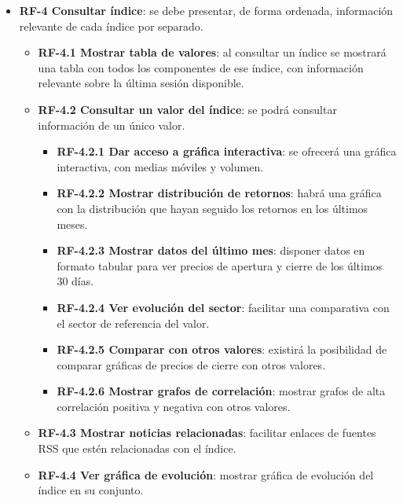 \begin{itemize}
\item
\textbf{RF-4 Consultar índice}: se debe presentar, de forma ordenada, información relevante de cada índice por separado.  
	\begin{itemize}
        \item \textbf{RF-4.1 Mostrar tabla de valores}: al consultar un índice se mostrará 
        una tabla con todos los componentes de ese índice, con información relevante sobre 
        la última sesión disponible. 
        \item \textbf{RF-4.2 Consultar un valor del índice}: se podrá consultar información 
        de un único valor. 
        \begin{itemize}
            \item \textbf{RF-4.2.1 Dar acceso a gráfica interactiva}: se ofrecerá una 
            gráfica interactiva, con medias móviles y volumen. 
            \item \textbf{RF-4.2.2 Mostrar distribución de retornos}: habrá una gráfica con 
            la distribución que hayan seguido los retornos en los últimos meses. 
            \item \textbf{RF-4.2.3 Mostrar datos del último mes}: disponer datos en formato 
            tabular para ver precios de apertura y cierre de los últimos 30 días. 
            \item \textbf{RF-4.2.4 Ver evolución del sector}: facilitar una comparativa con 
            el sector de referencia del valor. 
            \item \textbf{RF-4.2.5 Comparar con otros valores}: existirá la posibilidad de 
            comparar gráficas de precios de cierre con otros valores. 
            \item \textbf{RF-4.2.6 Mostrar grafos de correlación}: mostrar grafos de alta 
            correlación positiva y negativa con otros valores. 
        \end{itemize}
        \item \textbf{RF-4.3 Mostrar noticias relacionadas}: facilitar enlaces de fuentes 
        RSS que estén relacionadas con el índice.
        \item \textbf{RF-4.4 Ver gráfica de evolución}: mostrar gráfica de evolución del
        índice en su conjunto. 
	\end{itemize}	




\end{itemize}
